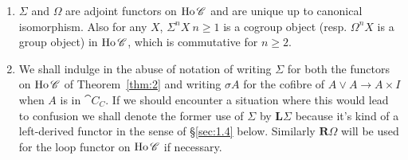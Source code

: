 \documentclass[../main]{subfiles}
\begin{document}
\begin{remark*}
    \begin{enumerate}
        \item $\Sigma$ and $\Omega$ are adjoint functors on $\operatorname{Ho} \mathscr{C}$ and are unique up to canonical isomorphism. Also for any $X$, $\Sigma^n X \ n\geq 1$ is a cogroup object (resp. $\Omega^n X$ is a group object) in $\operatorname{Ho} \mathscr{C}$, which is commutative for $n \geq 2$.
        \item We shall indulge in the abuse of notation of writing $\Sigma$ for both the functors on $\operatorname{Ho} \mathscr{C}$ of Theorem~\ref{thm:2} and writing $\sigma A$ for the cofibre of $A \vee A \longrightarrow A \times I$ when $A$ is in $\cat{C}_C$. If we should encounter a situation where this would lead to confusion we shall denote the former use of $\Sigma$ by $\mathbf{L}\Sigma$ because it's kind of a left-derived functor in the sense of \S \ref{sec:1.4} below. Similarly $\mathbf{R} \Omega$ will be used for the loop functor on $\operatorname{Ho} \mathscr{C}$ if necessary. 
    \end{enumerate}
\end{remark*}
\end{document}
